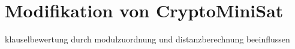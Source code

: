 \chapter{Modifikation von CryptoMiniSat}
\label{chp:modification}

klauselbewertung durch modulzuordnung und distanzberechnung beeinflussen\\

